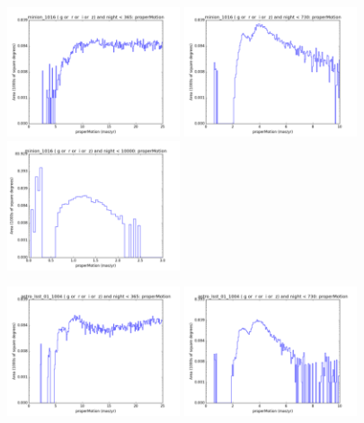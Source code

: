 \begin{figure}[ht]
  \begin{center}
  \includegraphics[width=2.0in]{./figs/milkyway/astromPanels/MW_Astrom_pmError_Baseline_01y_hst.png}
  \includegraphics[width=2.0in]{./figs/milkyway/astromPanels/MW_Astrom_pmError_Baseline_02y_hst.png}
  \includegraphics[width=2.0in]{./figs/milkyway/astromPanels/MW_Astrom_pmError_Baseline_10y_hst.png}
  \end{center}
  \begin{center}
  \includegraphics[width=2.0in]{./figs/milkyway/astromPanels/MW_Astrom_pmError_wfdPlane_01y_hst.png}
  \includegraphics[width=2.0in]{./figs/milkyway/astromPanels/MW_Astrom_pmError_wfdPlane_02y_hst.png}

\end{center}
\end{figure}
